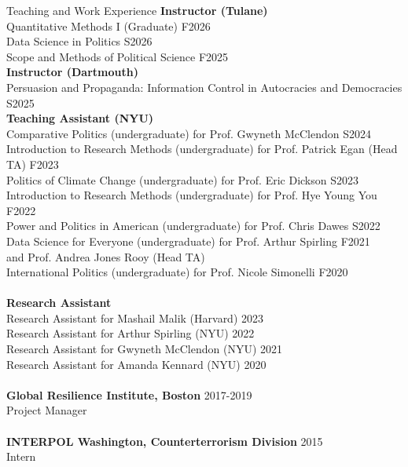 \documentclass{resume} %
\begin{document}
	\begin{rSection}{Teaching and Work Experience}
		\bigskip
		\textbf{Instructor (Tulane)}\\
		Quantitative Methods I (Graduate) \hfill F2026\\
		Data Science in Politics \hfill S2026\\
		Scope and Methods of Political Science \hfill F2025\\
		
		\textbf{Instructor (Dartmouth)}\\
		Persuasion and Propaganda: Information Control in Autocracies and Democracies \hfill S2025\\
		
		
		\textbf{Teaching Assistant (NYU)}\\
		Comparative Politics (undergraduate) for Prof. Gwyneth McClendon \hfill S2024\\
		Introduction to Research Methods (undergraduate) for Prof. Patrick Egan (Head TA) \hfill F2023\\
		Politics of Climate Change (undergraduate) for Prof. Eric Dickson \hfill S2023\\
		Introduction to Research Methods (undergraduate) for Prof. Hye Young You \hfill F2022\\
		Power and Politics in American (undergraduate) for Prof. Chris Dawes \hfill S2022\\
		Data Science for Everyone (undergraduate) for Prof. Arthur Spirling \hfill F2021\\
		\indent  and Prof. Andrea Jones Rooy (Head TA)\\
		International Politics (undergraduate) for Prof. Nicole Simonelli \hfill F2020\\
		\\
		\textbf{Research Assistant}\\
		Research Assistant for Mashail Malik (Harvard) \hfill 2023\\
		Research Assistant for Arthur Spirling (NYU) \hfill 2022\\
		Research Assistant for Gwyneth McClendon (NYU) \hfill 2021\\
		Research Assistant for Amanda Kennard (NYU) \hfill 2020\\
		\\
		\textbf{Global Resilience Institute, Boston} \hfill 2017-2019\\
		Project Manager\\
		\\
		\textbf{INTERPOL Washington, Counterterrorism Division} \hfill 2015\\
		Intern\\
		
	\end{rSection} 
\end{document}
